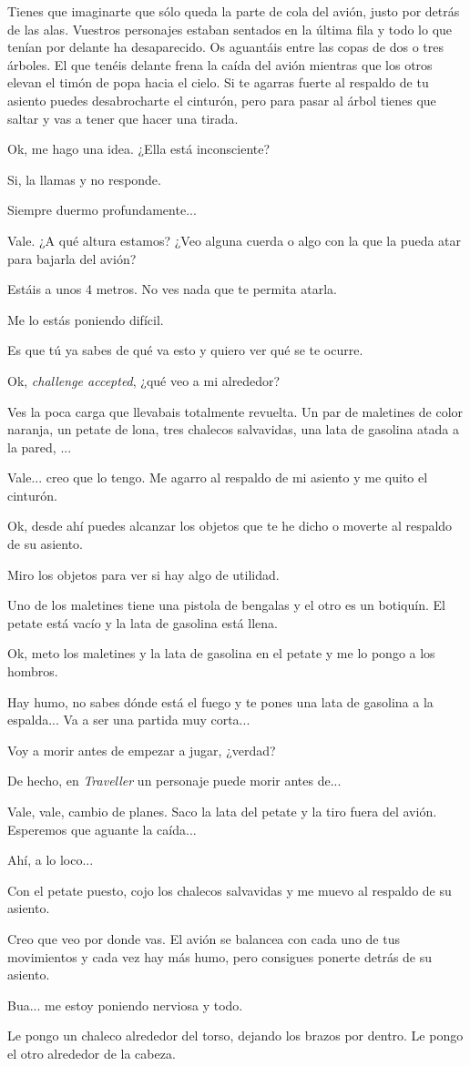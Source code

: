 \documentclass[10pt, a5paper, twocolumn]{article}
\newcommand\E{\item[\raisebox{-0.25em}{\scalebox{0.75}{\bcicosaedre}}]}
\newcommand\B{\item[\raisebox{-0.25em}{\scalebox{0.75}{\bccube}}]}
\newcommand\A{\item[\raisebox{-0.25em}{\scalebox{0.75}{\bctetraedre}}]}
\newenvironment{dialogue}
    {\begin{description}[leftmargin=!,align=right,labelwidth=0.cm]}
    {\end{description}}
\begin{document}
\begin{dialogue}
        \E Tienes que imaginarte que sólo queda la parte de cola del avión, justo por detrás de las alas. Vuestros personajes estaban sentados en la última fila y todo lo que tenían por delante ha desaparecido. Os aguantáis entre las copas de dos o tres árboles. El que tenéis delante frena la caída del avión mientras que los otros elevan el timón de popa hacia el cielo. Si te agarras fuerte al respaldo de tu asiento puedes desabrocharte el cinturón, pero para pasar al árbol tienes que saltar y vas a tener que hacer una tirada.
        \B Ok, me hago una idea. ¿Ella está inconsciente?
        \E Si, la llamas y no responde.
        \A Siempre duermo profundamente...
        \B Vale. ¿A qué altura estamos? ¿Veo alguna cuerda o algo con la que la pueda atar para bajarla del avión?
        \E Estáis a unos 4 metros. No ves nada que te permita atarla.
        \B Me lo estás poniendo difícil.
        \E Es que tú ya sabes de qué va esto y quiero ver qué se te ocurre.
        \B Ok, \emph{challenge accepted}, ¿qué veo a mi alrededor?
        \E Ves la poca carga que llevabais totalmente revuelta. Un par de maletines de color naranja, un petate de lona, tres chalecos salvavidas, una lata de gasolina atada a la pared, ...
        \B Vale... creo que lo tengo. Me agarro al respaldo de mi asiento y me quito el cinturón.
        \E Ok, desde ahí puedes alcanzar los objetos que te he dicho o moverte al respaldo de su asiento.
        \B Miro los objetos para ver si hay algo de utilidad.
        \E Uno de los maletines tiene una pistola de bengalas y el otro es un botiquín. El petate está vacío y la lata de gasolina está llena.
        \B Ok, meto los maletines y la lata de gasolina en el petate y me lo pongo a los hombros.
        \E Hay humo, no sabes dónde está el fuego y te pones una lata de gasolina a la espalda... Va a ser una partida muy corta...
        \A Voy a morir antes de empezar a jugar, ¿verdad?
        \E De hecho, en \emph{Traveller} un personaje puede morir antes de...
        \B Vale, vale, cambio de planes. Saco la lata del petate y la tiro fuera del avión. Esperemos que aguante la caída...
        \E Ahí, a lo loco...
        \B Con el petate puesto, cojo los chalecos salvavidas y me muevo al respaldo de su asiento.
        \E Creo que veo por donde vas. El avión se balancea con cada uno de tus movimientos y cada vez hay más humo, pero consigues ponerte detrás de su asiento.
        \A Bua... me estoy poniendo nerviosa y todo.
        \B Le pongo un chaleco alrededor del torso, dejando los brazos por dentro. Le pongo el otro alrededor de la cabeza.

\end{dialogue}
\end{document}

